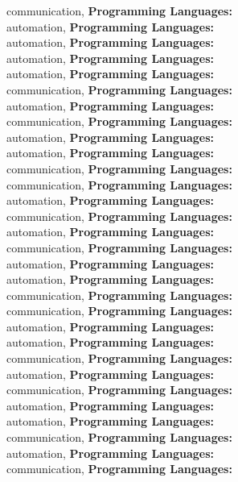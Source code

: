 communication, \textbf{Programming Languages:} \\
automation, \textbf{Programming Languages:} \\
automation, \textbf{Programming Languages:} \\
automation, \textbf{Programming Languages:} \\
automation, \textbf{Programming Languages:} \\
 communication, \textbf{Programming Languages:} \\
automation, \textbf{Programming Languages:} \\
 communication, \textbf{Programming Languages:} \\
automation, \textbf{Programming Languages:} \\
automation, \textbf{Programming Languages:} \\
 communication, \textbf{Programming Languages:} \\
 communication, \textbf{Programming Languages:} \\
automation, \textbf{Programming Languages:} \\
 communication, \textbf{Programming Languages:} \\
automation, \textbf{Programming Languages:} \\
 communication, \textbf{Programming Languages:} \\
automation, \textbf{Programming Languages:} \\
automation, \textbf{Programming Languages:} \\
 communication, \textbf{Programming Languages:} \\
 communication, \textbf{Programming Languages:} \\
automation, \textbf{Programming Languages:} \\
automation, \textbf{Programming Languages:} \\
 communication, \textbf{Programming Languages:} \\
automation, \textbf{Programming Languages:} \\
 communication, \textbf{Programming Languages:} \\
automation, \textbf{Programming Languages:} \\
automation, \textbf{Programming Languages:} \\
 communication, \textbf{Programming Languages:} \\
automation, \textbf{Programming Languages:} \\
 communication, \textbf{Programming Languages:} \\
